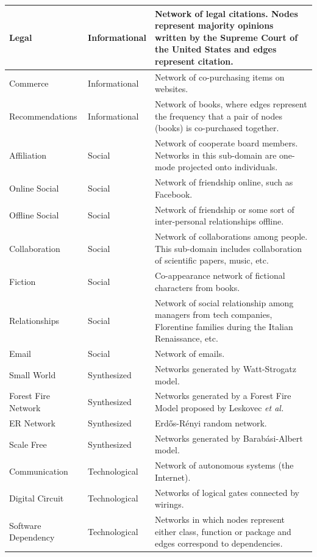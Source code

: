 \documentclass{article}
\begin{document}
\begin{longtable}{| l | l | p{9cm} |}
      Legal &  Informational & Network of legal citations. Nodes represent majority opinions written by the Supreme Court of the United States and edges represent citation.\\  \hline
      Commerce &  Informational & Network of co-purchasing items on websites.\\  \hline
      Recommendations &  Informational & Network of books, where edges represent the frequency that a pair of nodes (books) is co-purchased together.\\  \hline
      Affiliation &  Social & Network of cooperate board members. Networks in this sub-domain are one-mode projected onto individuals.\\  \hline
      Online Social &  Social & Network of friendship online, such as Facebook.\\  \hline
      Offline Social &  Social & Network of friendship or some sort of inter-personal relationships offline.\\  \hline
      Collaboration &  Social & Network of collaborations among people. This sub-domain includes collaboration of scientific papers, music, etc.\\  \hline
      Fiction &  Social & Co-appearance network of fictional characters from books.\\  \hline
      Relationships &  Social & Network of social relationship among managers from tech companies, Florentine families during the Italian Renaissance, etc.\\  \hline
      Email &  Social & Network of emails.\\  \hline
      Small World &  Synthesized & Networks generated by Watt-Strogatz model.\\  \hline
      Forest Fire Network &  Synthesized & Networks generated by a Forest Fire Model proposed by Leskovec \textit{et al.} \\  \hline
      ER Network &  Synthesized & Erd\H{o}s-R\'enyi random network. \\  \hline
      Scale Free &  Synthesized & Networks generated by Barab\'asi-Albert model.\\  \hline
      Communication &  Technological & Network of autonomous systems (the Internet).\\  \hline
      Digital Circuit &  Technological & Networks of logical gates connected by wirings.\\  \hline
      Software Dependency &  Technological & Networks in which nodes represent either class, function or package and edges correspond to dependencies.\\  \hline

\end{longtable}
\end{document}
